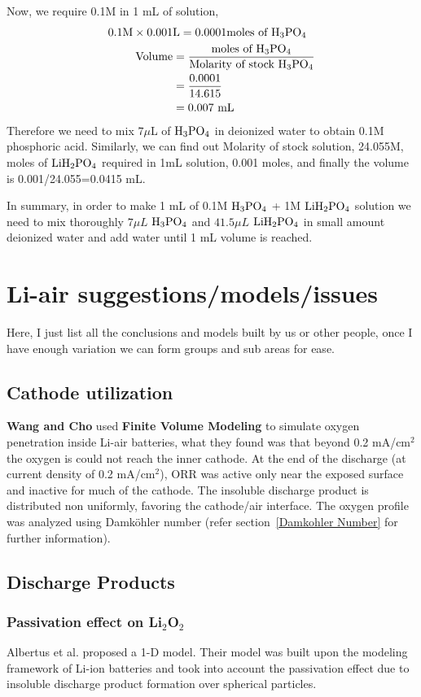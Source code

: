 \documentclass[12pt]{book}
\begin{document}
 Now, we require 0.1M in 1 mL of solution,
 \begin{align}
0.1\textrm{M}\times 0.001&\textrm{L} = 0.0001\textrm{moles of }\ce{H3PO4}\nonumber\\
\textrm{Volume}&=\frac{\textrm{moles of }\ce{H3PO4}}{\textrm{Molarity of stock }\ce{H3PO4}}\\
&=\frac{0.0001}{14.615}\nonumber\\
&=0.007\textrm{ mL}\nonumber
 \end{align}
 Therefore we need to mix $7 \mu$L of $\ce{H3PO4}$ in deionized water to obtain 0.1M phosphoric acid. Similarly, we can find out Molarity of stock solution, 24.055M, moles of $\ce{LiH2PO4}$ required in 1mL solution, 0.001 moles, and finally the volume is 0.001/24.055=0.0415 mL.

 In summary,
 in order to make 1 mL of 0.1M $\ce{H3PO4}$ + 1M $\ce{LiH2PO4}$ solution we need to mix thoroughly $7\mu L$ $\ce{H3PO4}$ and $41.5\mu L$ $\ce{LiH2PO4}$ in small amount deionized water and add water until 1 mL volume is reached. 
 
 
\chapter{Li-air suggestions/models/issues}
Here, I just list all the conclusions and models built by us or other people, once I have enough variation we can form groups and sub areas for ease.

\section{Cathode utilization}
\textbf{Wang and Cho} used \textbf{Finite Volume Modeling} to simulate oxygen penetration inside Li-air batteries, what they found was that beyond 0.2 mA/cm$^2$ the oxygen is could not reach the inner cathode. At the end of the discharge (at current density of 0.2 mA/cm$^2$), ORR was active only near the exposed surface and inactive for much of the cathode. The insoluble discharge product is distributed non uniformly, favoring the cathode/air interface. The oxygen profile was analyzed using Damk\"{o}hler number (refer section~\ref{Damkohler Number} for further information).

\section{Discharge Products}
\subsection{Passivation effect on Li$_2$O$_2$}
Albertus et al. proposed a 1-D model. Their model was built upon the modeling framework of Li-ion batteries and took into account the passivation effect due to insoluble discharge product formation over spherical particles.\cite{Albertus2011}
\end{document}
